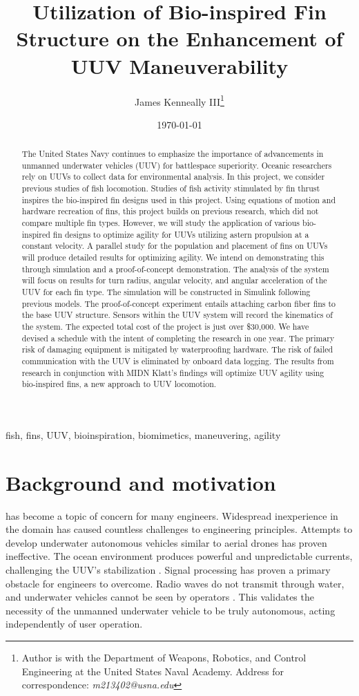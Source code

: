 \documentclass[]{IEEEtran}
\title{Utilization of Bio-inspired Fin Structure on the Enhancement of UUV Maneuverability}
\author{James Kenneally III\thanks{Author is with the Department of Weapons, Robotics, and Control Engineering at the United States Naval Academy. Address for correspondence: \emph{m213402@usna.edu}}}
\date{\today}
\begin{document}
\maketitle
\begin{abstract}
The United States Navy continues to emphasize the importance of advancements in unmanned underwater vehicles (UUV) for battlespace superiority.  Oceanic researchers rely on UUVs to collect data for environmental analysis.  In this project, we consider previous studies of fish locomotion.  Studies of fish activity stimulated by fin thrust inspires the bio-inspired fin designs used in this project.  Using equations of motion and hardware recreation of fins, this project builds on previous research, which did not compare multiple fin types.  However, we will study the application of various bio-inspired fin designs to optimize agility for UUVs utilizing astern propulsion at a constant velocity.  A parallel study for the population and placement of fins on UUVs will produce detailed results for optimizing agility.  We intend on demonstrating this through simulation and a proof-of-concept demonstration.  The analysis of the system will focus on results for turn radius, angular velocity, and angular acceleration of the UUV for each fin type.  The simulation will be constructed in Simulink following previous models.  The proof-of-concept experiment entails attaching carbon fiber fins to the base UUV structure.  Sensors within the UUV system will record the kinematics of the system.  The expected total cost of the project is just over \$30,000.  We have devised a schedule with the intent of completing the research in one year.  The primary risk of damaging equipment is mitigated by waterproofing hardware.  The risk of failed communication with the UUV is eliminated by onboard data logging.  The results from research in conjunction with MIDN Klatt’s findings will optimize UUV agility using bio-inspired fins, a new approach to UUV locomotion.  
\end{abstract}

\begin{IEEEkeywords}
fish, fins, UUV, bioinspiration, biomimetics, maneuvering, agility
\end{IEEEkeywords}

\section{Background and motivation}
 has become a topic of concern for many engineers.  Widespread inexperience in the domain has caused countless challenges to engineering principles.  Attempts to develop underwater autonomous vehicles similar to aerial drones has proven ineffective.  The ocean environment produces powerful and unpredictable currents, challenging the UUV’s stabilization \cite{risen2019underwater}.  Signal processing has proven a primary obstacle for engineers to overcome.  Radio waves do not transmit through water, and underwater vehicles cannot be seen by operators \cite{risen2019underwater}.  This validates the necessity of the unmanned underwater vehicle to be truly autonomous, acting independently of user operation.  
\end{document}
